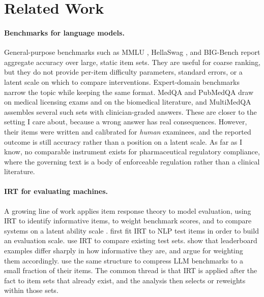 \section{Related Work}
\label{sec:related}

\paragraph{Benchmarks for language models.}
General-purpose benchmarks such as MMLU \citep{hendrycks2021mmlu},
HellaSwag \citep{zellers2019hellaswag}, and BIG-Bench
\citep{srivastava2023bigbench} report aggregate accuracy over large,
static item sets. They are useful for coarse ranking, but they do not
provide per-item difficulty parameters, standard errors, or a latent
scale on which to compare interventions. Expert-domain benchmarks narrow
the topic while keeping the same format. MedQA \citep{jin2021medqa} and
PubMedQA \citep{jin2019pubmedqa} draw on medical licensing exams and on
the biomedical literature, and MultiMedQA \citep{singhal2023clinical}
assembles several such sets with clinician-graded answers. These are
closer to the setting I care about, because a wrong answer has real
consequences. However, their items were written and calibrated for
\emph{human} examinees, and the reported outcome is still accuracy rather
than a position on a latent scale. As far as I know, no comparable
instrument exists for pharmaceutical regulatory compliance, where the
governing text is a body of enforceable regulation rather than a clinical
literature.

\paragraph{IRT for evaluating machines.}
A growing line of work applies item response theory to model evaluation,
using IRT to identify informative items, to weight benchmark scores, and
to compare systems on a latent ability scale
\citep{lalor2016building,vania2021comparing,rodriguez2021evaluation,maiapolo2024tinybenchmarks}.
\citet{lalor2016building} first fit IRT to NLP test items in order to
build an evaluation scale. \citet{vania2021comparing} use IRT to compare
existing test sets. \citet{rodriguez2021evaluation} show that leaderboard
examples differ sharply in how informative they are, and argue for
weighting them accordingly. \citet{maiapolo2024tinybenchmarks} use the
same structure to compress LLM benchmarks to a small fraction of their
items. The common thread is that IRT is applied after the fact to item
sets that already exist, and the analysis then selects or reweights
within those sets.

